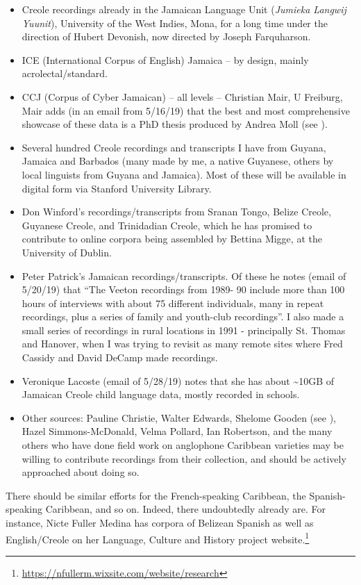 \documentclass[output=paper,colorlinks,citecolor=brown]{langscibook}
\begin{document}
\begin{itemize}
\item  Creole recordings already in the Jamaican Language Unit (\textit{Jumieka Langwij Yuunit}), University of the West Indies, Mona, for a long time under the direction of Hubert Devonish, now directed by Joseph Farquharson.
\item  ICE (International Corpus of English) Jamaica -- by design, mainly acrolectal/standard. 
\item  CCJ (Corpus of Cyber Jamaican) -- all levels -- Christian Mair, U Freiburg, Mair adds (in an email from 5/16/19) that the best and most comprehensive showcase of these data is a PhD thesis produced by Andrea Moll (see \citealt{Moll2015}). 
\item  Several hundred Creole recordings and transcripts I have from Guyana, Jamaica and Barbados (many made by me, a native Guyanese, others by local linguists from Guyana and Jamaica).   Most of these will be available in digital form via Stanford University Library. 
\item  Don Winford’s recordings/transcripts from Sranan Tongo, Belize Creole, Guyanese Creole, and Trinidadian Creole, which he has promised to contribute to online corpora being assembled by Bettina Migge, at the University of Dublin. 
\item  Peter Patrick’s Jamaican recordings/transcripts.  Of these he notes (email of 5/20/19) that “The Veeton recordings from 1989- 90 include more than 100 hours of interviews with about 75 different individuals, many in repeat recordings, plus a series of family and youth-club recordings”. I also made a small series of recordings in rural locations in 1991 - principally St. Thomas and Hanover, when I was trying to revisit as many remote sites where Fred Cassidy and David DeCamp made recordings.
\item  Veronique Lacoste (email of 5/28/19) notes that she has about {\textasciitilde}10GB of Jamaican Creole child language data, mostly recorded in schools. 
\item  Other sources: Pauline Christie, Walter Edwards, Shelome Gooden (see \citealt{Gooden2003}), Hazel Simmons-McDonald, Velma Pollard, Ian Robertson, and the many others who have done field work on anglophone Caribbean varieties may be willing to contribute recordings from their collection, and should be actively approached about doing so.
\end{itemize}

There should be similar efforts for the French-speaking Caribbean, the Span\-ish-speaking Caribbean, and so on.  Indeed, there undoubtedly already are.  For instance, Nicte Fuller Medina has corpora of Belizean Spanish as well as English\slash Creole on her Language, Culture and History project website.\footnote{\url{https://nfullerm.wixsite.com/website/research}}
\end{document}
